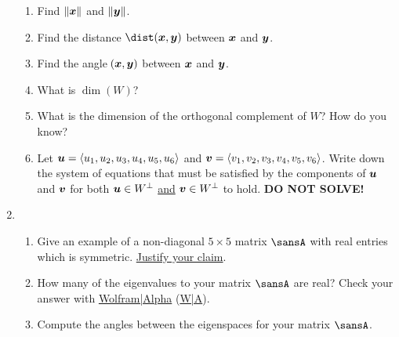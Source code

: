 \documentclass[12pt]{article}
\begin{document}
\begin{enumerate}[topsep=0.125in, itemsep=0.5in]
\begin{enumerate}[itemsep=0.25in]
			\item Find $\|\boldsymbol{x}\|$ and $\|\boldsymbol{y}\|$.
			
			\item Find the distance $\dist(\vect{x},\vect{y})$ between $\boldsymbol{x}$ and $\boldsymbol{y}$.
			
			\item Find the angle \raisebox{-0.5mm}{\large{$\measuredangle$}}$\hspace{-0.375mm}\left(\boldsymbol{x},\boldsymbol{y}\right)$ between $\boldsymbol{x}$ and $\boldsymbol{y}$.
			
			\item What is $\dim(W)$?
			
			\item What is the dimension of the orthogonal complement of $W$? How do you know?
			
			\item Let $\boldsymbol{u}=\langle u_1,u_2,u_3,u_4,u_5,u_6\rangle$ and $\boldsymbol{v}=\langle v_1,v_2,v_3,v_4,v_5,v_6\rangle$. Write down the system of equations that must be satisfied by the components of $\boldsymbol{u}$ and $\boldsymbol{v}$ for both $\boldsymbol{u}\in W^\perp$ \ul{and} $\boldsymbol{v}\in W^\perp$ to hold. \textbf{DO NOT SOLVE!}
		\end{enumerate}
		
		\item 
		\begin{enumerate}[listparindent=6mm,topsep=0.125in, itemsep=0.25in]
			\item Give an example of a non-diagonal $5\times 5$ matrix $\sansA$ with real entries which is symmetric. \ul{Justify your claim}.
			\item How many of the eigenvalues to your matrix $\sansA$ are real? Check your answer with \url{Wolfram|Alpha} (\url{W|A}).
			
			\vspace{-4mm}
			
			\item Compute the angles between the eigenspaces for your matrix $\sansA$.
			
		\end{enumerate}
		

\end{enumerate}
\end{document}

